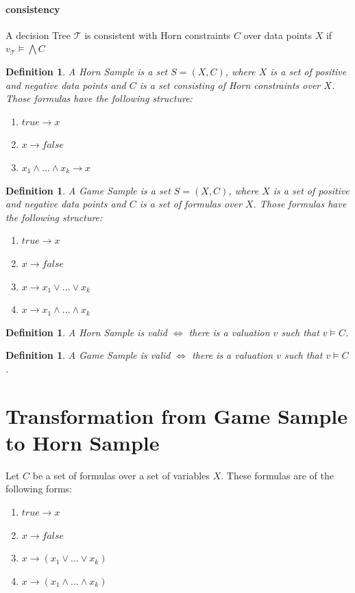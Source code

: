 \documentclass[10pt,a4paper]{article}
\theoremstyle{plain}
\newtheorem{mydef}[thm]{Definition}
\theoremstyle{definition}
\begin{document}
\paragraph*{consistency} A decision Tree $\mathcal{T}$ is consistent with Horn constraints $C$ over data points $X$ if 
$v_\mathcal{T} \vDash \bigwedge C$
\begin{mydef}
A \emph{Horn Sample} is a set $S = (X,C)$, where $X$ is a set of positive and negative data points and $C$ is a set consisting of Horn constraints over $X$. Those formulas have the following structure:
\begin{enumerate}
\item $true \to x$
\item $x \to false$
\item $x_1 \wedge...\wedge x_k \to x $
\end{enumerate}
\end{mydef}
\begin{mydef}
A \emph{Game Sample} is a set $S = (X,C)$, where $X$ is a set of positive and negative data points and $C$ is a set of formulas over $X$. Those formulas have the following structure:
\begin{enumerate}
\item $true \to x$
\item $x \to false$
\item $x \to x_1 \vee  ... \vee x_k$
\item $x \to x_1 \wedge ... \wedge x_k$ 
\end{enumerate}
\end{mydef}

\begin{mydef}
A Horn Sample is \emph{valid} $\iff $ there is a valuation $v$ such that $v \vDash C$.
\end{mydef}
\begin{mydef}
A Game Sample is \emph{valid} $\iff $ there is a valuation $v$ such that $v \vDash C$.
\end{mydef}

\section{Transformation from Game Sample to Horn Sample} \label{transformation}
Let $C$ be a set of formulas over a set of variables $X$. These formulas are of the following forms:
\begin{enumerate}
\item $true \to x$
\item $x \to false$
\item $ x \to (x_1 \vee  ... \vee x_k)$
\item $ x\to (x_1 \wedge ... \wedge x_k)$
\end{enumerate}
\end{document}
